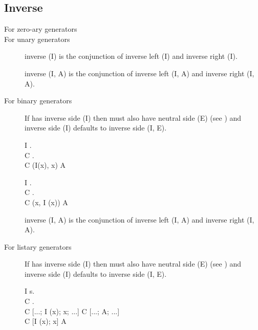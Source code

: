 \subsection{Inverse}
\label{sec:inverse}
\begin{description}

\item[For zero-ary generators] \na
\item[For unary generators] 
inverse (I) is the conjunction of inverse left (I) and inverse right
(I).

inverse (I, A) is the conjunction of inverse left (I, A) and inverse
right (I, A).

\item[For binary generators] 
 If \C has inverse side (I) then \C must also have neutral
side (E) (see ) and inverse side (I) defaults to
inverse side (I, E).

{ I . \\
  C . \\ 
  C (I(x), x) \rw A
}

{ I . \\
  C . \\ 
  C (x, I (x)) \rw A
}

inverse (I, A) is the conjunction of inverse left (I, A) and inverse
right (I, A). 
\item[For listary generators] If \C has inverse side (I) then \C must also have neutral
side (E) (see ) and inverse side (I) defaults to
inverse side (I, E).

{ I s. \\
  C . \\ 

            C [...; I (x); x; ...] \rw C [...; A; ...]  \\
            C [I (x); x] \rw A
  }


\end{description}
